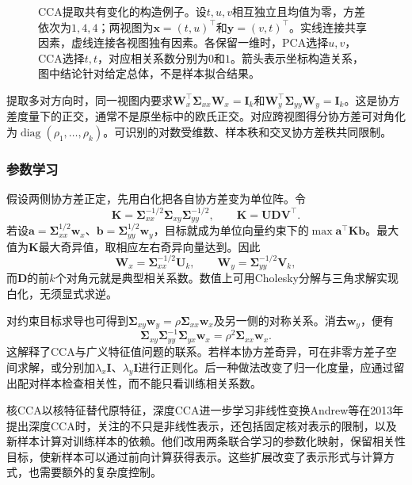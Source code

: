 \begin{figure}[!ht]
  \centering
  
  \caption{CCA提取共有变化的构造例子。设$t,u,v$相互独立且均值为零，方差依次为$1,4,4$；两视图为$\bm{x}=(t,u)^\top$和$\bm{y}=(v,t)^\top$。实线连接共享因素，虚线连接各视图独有因素。各保留一维时，PCA选择$u,v$，CCA选择$t,t$，对应相关系数分别为$0$和$1$。箭头表示坐标构造关系，图中结论针对给定总体，不是样本拟合结果。}
  \label{fig:dim-cca-shared}
\end{figure}

提取多对方向时，同一视图内要求$\bm{W}_x^{\top}\bm{\Sigma}_{xx}\bm{W}_x=\bm{I}_k$和$\bm{W}_y^{\top}\bm{\Sigma}_{yy}\bm{W}_y=\bm{I}_k$。这是协方差度量下的正交，通常不是原坐标中的欧氏正交。对应跨视图得分协方差可对角化为$\operatorname{diag}(\rho_1,\ldots,\rho_k)$。可识别的对数受维数、样本秩和交叉协方差秩共同限制。

\subsubsection{参数学习}
\label{sec:dim-cca-learning}

假设两侧协方差正定，先用白化把各自协方差变为单位阵。令
\[
  \bm{K}=\bm{\Sigma}_{xx}^{-1/2}
               \bm{\Sigma}_{xy}\bm{\Sigma}_{yy}^{-1/2},
  \qquad
  \bm{K}=\bm{U}\bm{D}\bm{V}^{\top}.
\]
若设$\bm{a}=\bm{\Sigma}_{xx}^{1/2}\bm{w}_x$、$\bm{b}=\bm{\Sigma}_{yy}^{1/2}\bm{w}_y$，目标就成为单位向量约束下的$\max\bm{a}^{\top}\bm{K}\bm{b}$。最大值为$\bm{K}$最大奇异值，取相应左右奇异向量达到。因此
\begin{equation}
  \bm{W}_x=\bm{\Sigma}_{xx}^{-1/2}\bm{U}_k,\qquad
  \bm{W}_y=\bm{\Sigma}_{yy}^{-1/2}\bm{V}_k,
  \label{eq:dim-cca-svd}
\end{equation}
而$\bm{D}$的前$k$个对角元就是典型相关系数。数值上可用Cholesky分解与三角求解实现白化，无须显式求逆。

对约束目标求导也可得到$\bm{\Sigma}_{xy}\bm{w}_y=\rho\bm{\Sigma}_{xx}\bm{w}_x$及另一侧的对称关系。消去$\bm{w}_y$，便有
\[
  \bm{\Sigma}_{xy}\bm{\Sigma}_{yy}^{-1}
       \bm{\Sigma}_{yx}\bm{w}_x
  =\rho^2\bm{\Sigma}_{xx}\bm{w}_x.
\]
这解释了CCA与广义特征值问题的联系。若样本协方差奇异，可在非零方差子空间求解，或分别加$\lambda_x\bm{I}$、$\lambda_y\bm{I}$进行正则化。后一种做法改变了归一化度量，应通过留出配对样本检查相关性，而不能只看训练相关系数。

核CCA以核特征替代原特征，深度CCA进一步学习非线性变换Andrew等在2013年提出深度CCA时，关注的不只是非线性表示，还包括固定核对表示的限制，以及新样本计算对训练样本的依赖。他们改用两条联合学习的参数化映射，保留相关性目标，使新样本可以通过前向计算获得表示。这些扩展改变了表示形式与计算方式，也需要额外的复杂度控制。

